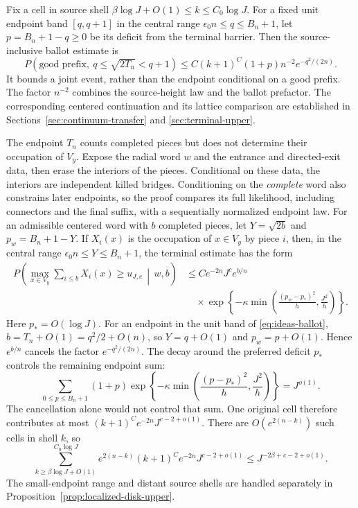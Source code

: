 \documentclass[12pt,reqno]{amsart}
\theoremstyle{plain}
\theoremstyle{definition}
\theoremstyle{remark}
\numberwithin{equation}{section}
\begin{document}
Fix a cell in source shell
$\beta\log J+O(1)\le k\le C_0\log J$. For a fixed unit endpoint
band $[q,q+1]$ in the central range $\epsilon_0n\le q\le B_n+1$,
let $p=B_n+1-q\ge0$ be its deficit from the terminal barrier. Then
the source-inclusive ballot estimate is
\begin{equation}\label{eq:ideas-ballot}
 P(\text{good prefix},\ q\le\sqrt{2T_n}<q+1)
 \le C(k+1)^C(1+p)n^{-2}e^{-q^2/(2n)}.
\end{equation}
It bounds a joint event, rather than the endpoint conditional on a good
prefix. The factor $n^{-2}$ combines the source-height law and the ballot
prefactor. The corresponding centered continuation and its lattice
comparison are established in Sections~\ref{sec:continuum-transfer} and
\ref{sec:terminal-upper}.

The endpoint $T_n$ counts completed pieces but does not determine their
occupation of $V_y$. Expose the radial word $w$ and the entrance and
directed-exit data, then erase the interiors of the pieces. Conditional
on these data, the interiors are independent killed bridges. Conditioning
on the \emph{complete} word also constrains later endpoints, so the proof
compares its full likelihood, including connectors and the final suffix,
with a sequentially normalized endpoint law. For an admissible centered
word with $b$ completed pieces, let $Y=\sqrt{2b}$ and
$p_w=B_n+1-Y$. If $X_i(x)$ is the occupation of $x\in V_y$ by piece
$i$, then, in the central range $\epsilon_0n\le Y\le B_n+1$, the
terminal estimate has the form
\[
\begin{aligned}
 P\left(\max_{x\in V_y}\sum_{i\le b}X_i(x)\ge u_{J,c}
       \,\middle|\,w,b\right)
 &\le Ce^{-2n}J^c e^{b/n}\\
 &\quad\times\exp\left\{-\kappa\min\left(
      \frac{(p_w-p_*)^2}{h},\frac{J^2}{h}\right)\right\}.
\end{aligned}
\]
Here $p_*=O(\log J)$.
For an endpoint in the unit band of \eqref{eq:ideas-ballot},
$b=T_n+O(1)=q^2/2+O(n)$, so $Y=q+O(1)$ and $p_w=p+O(1)$.
Hence $e^{b/n}$ cancels the factor $e^{-q^2/(2n)}$. The decay around
the preferred deficit $p_*$ controls the remaining endpoint sum:
\[
 \sum_{0\le p\le B_n+1}(1+p)
 \exp\left\{-\kappa\min\left(\frac{(p-p_*)^2}{h},
                                   \frac{J^2}{h}\right)\right\}
 =J^{o(1)}.
\]
The cancellation alone would not control that sum. One original cell
therefore contributes at most $(k+1)^Ce^{-2n}J^{c-2+o(1)}$. There are
$O(e^{2(n-k)})$ such cells in shell $k$, so
\[
 \sum_{k\ge\beta\log J+O(1)}^{C_0\log J}
 e^{2(n-k)}(k+1)^Ce^{-2n}J^{c-2+o(1)}
 \le J^{-2\beta+c-2+o(1)}.
\]
The small-endpoint range and distant source
shells are handled separately in Proposition~\ref{prop:localized-disk-upper}.
\end{document}
